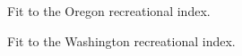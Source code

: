 \documentclass[
]{scrartcl}
\begin{document}
\begin{figure}


\caption{\label{fig-indexfit6}Fit to the Oregon recreational index.}

\end{figure}%

\begin{figure}


\caption{\label{fig-indexfit7}Fit to the Washington recreational index.}

\end{figure}%
\end{document}
